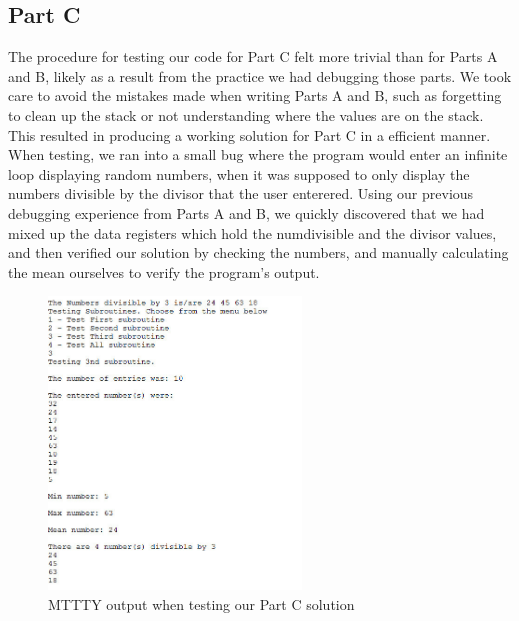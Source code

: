 \documentclass[letterpaper]{article}
\begin{document}
    \subsection{Part C}
      The procedure for testing our code for Part C felt more trivial
      than for Parts A and B, likely as a result from the practice
      we had debugging those parts. We took care to avoid the
      mistakes made when writing Parts A and B, such as forgetting
      to clean up the stack or not understanding where the values
      are on the stack. This resulted in producing a working solution for
      Part C in a efficient manner. When testing, we ran into a small bug where
      the program would enter an infinite loop displaying random numbers, when
      it was supposed to only display the numbers divisible by the divisor that the
      user enterered. Using our previous debugging experience from Parts A and
      B, we quickly discovered that we had mixed up the data registers which hold
      the numdivisible and the divisor values, and then verified our
      solution by checking the numbers, and manually calculating the mean ourselves
      to verify the program's output.

      \begin{figure}[H]
        \centering
        \includegraphics[width=0.6\textwidth]{partc.jpg}
        \caption{MTTTY output when testing our Part C solution}
      \end{figure}
\end{document}
